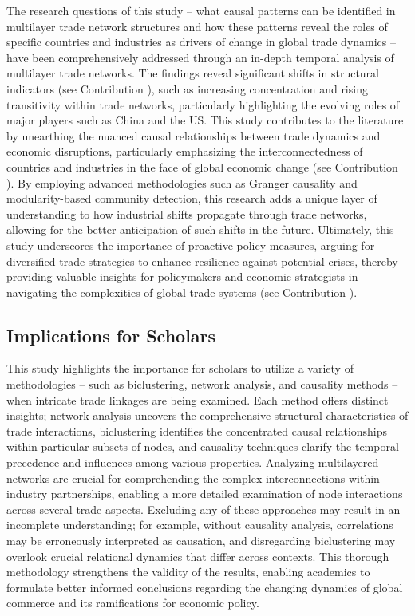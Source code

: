 \documentclass[preprint, 3p,
authoryear]{elsarticle} %
\begin{document}
The research questions of this study -- what causal patterns can be
identified in multilayer trade network structures and how these patterns
reveal the roles of specific countries and industries as drivers of
change in global trade dynamics -- have been comprehensively addressed
through an in-depth temporal analysis of multilayer trade networks. The
findings reveal significant shifts in structural indicators (see
Contribution ), such as increasing concentration and rising
transitivity within trade networks, particularly highlighting the
evolving roles of major players such as China and the US. This study
contributes to the literature by unearthing the nuanced causal
relationships between trade dynamics and economic disruptions,
particularly emphasizing the interconnectedness of countries and
industries in the face of global economic change (see Contribution
). By employing advanced methodologies such as Granger
causality and modularity-based community detection, this research adds a
unique layer of understanding to how industrial shifts propagate through
trade networks, allowing for the better anticipation of such shifts in
the future. Ultimately, this study underscores the importance of
proactive policy measures, arguing for diversified trade strategies to
enhance resilience against potential crises, thereby providing valuable
insights for policymakers and economic strategists in navigating the
complexities of global trade systems (see Contribution ).

\subsection{Implications for Scholars}\label{implications-for-scholars}

This study highlights the importance for scholars to utilize a variety
of methodologies -- such as biclustering, network analysis, and
causality methods -- when intricate trade linkages are being examined.
Each method offers distinct insights; network analysis uncovers the
comprehensive structural characteristics of trade interactions,
biclustering identifies the concentrated causal relationships within
particular subsets of nodes, and causality techniques clarify the
temporal precedence and influences among various properties. Analyzing
multilayered networks are crucial for comprehending the complex
interconnections within industry partnerships, enabling a more detailed
examination of node interactions across several trade aspects. Excluding
any of these approaches may result in an incomplete understanding; for
example, without causality analysis, correlations may be erroneously
interpreted as causation, and disregarding biclustering may overlook
crucial relational dynamics that differ across contexts. This thorough
methodology strengthens the validity of the results, enabling academics
to formulate better informed conclusions regarding the changing dynamics
of global commerce and its ramifications for economic policy.
\end{document}
